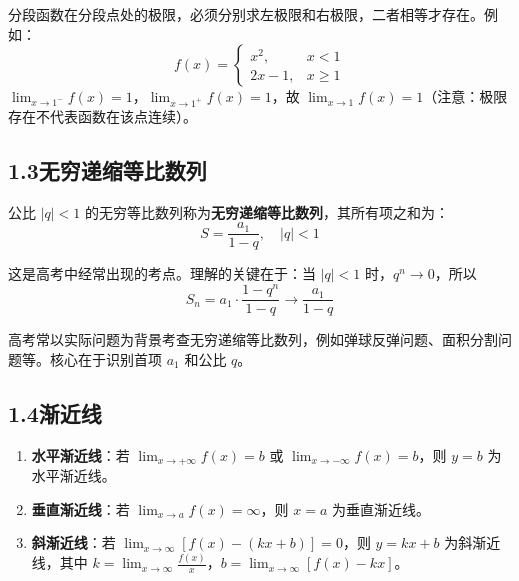 \documentclass[12pt, a4paper]{ctexart}
\begin{document}
\begin{warnbox}[易错提醒]
分段函数在分段点处的极限，必须分别求左极限和右极限，二者相等才存在。例如：
\[
f(x) = \begin{cases} x^2, & x < 1 \\ 2x - 1, & x \geq 1 \end{cases}
\]
$\lim_{x \to 1^-} f(x) = 1$，$\lim_{x \to 1^+} f(x) = 1$，故 $\lim_{x \to 1} f(x) = 1$（注意：极限存在不代表函数在该点连续）。
\end{warnbox}

\subsection*{1.3\quad 无穷递缩等比数列}

\begin{knowledgebox}[定义与求和公式]
公比 $|q| < 1$ 的无穷等比数列称为\textbf{无穷递缩等比数列}，其所有项之和为：
\[
S = \frac{a_1}{1 - q}, \quad |q| < 1
\]
\end{knowledgebox}

这是高考中经常出现的考点。理解的关键在于：当 $|q| < 1$ 时，$q^n \to 0$，所以
\[
S_n = a_1 \cdot \frac{1 - q^n}{1 - q} \to \frac{a_1}{1 - q}
\]

\begin{tipbox}[高考常见题型]
高考常以实际问题为背景考查无穷递缩等比数列，例如弹球反弹问题、面积分割问题等。核心在于识别首项 $a_1$ 和公比 $q$。
\end{tipbox}

\subsection*{1.4\quad 渐近线}

\begin{knowledgebox}[渐近线的分类]
\begin{enumerate}[leftmargin=2em]
  \item \textbf{水平渐近线}：若 $\lim_{x \to +\infty} f(x) = b$ 或 $\lim_{x \to -\infty} f(x) = b$，则 $y = b$ 为水平渐近线。
  \item \textbf{垂直渐近线}：若 $\lim_{x \to a} f(x) = \infty$，则 $x = a$ 为垂直渐近线。
  \item \textbf{斜渐近线}：若 $\lim_{x \to \infty} [f(x) - (kx + b)] = 0$，则 $y = kx + b$ 为斜渐近线，其中 $k = \lim_{x \to \infty} \frac{f(x)}{x}$，$b = \lim_{x \to \infty} [f(x) - kx]$。
\end{enumerate}
\end{knowledgebox}
\end{document}
